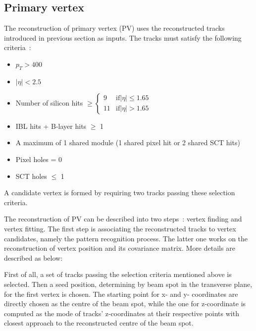 \subsection{Primary vertex}

The reconstruction of primary vertex (PV) uses the reconstructed tracks introduced in previous section as inputs.
The tracks must satisfy the following criteria~\cite{ATL-PHYS-PUB-2015-026}:
\begin{itemize}
	\item $p_{T} > 400$ ~\mev
	\item $|\eta| < 2.5$
	\item Number of silicon hits 
$\geq 
\begin{cases}
9&  \text{if} |\eta| \le 1.65\\
11& \text{if} |\eta| > 1.65
\end{cases}$
	\item IBL hits + B-layer hits $\ge$ 1
	\item A maximum of 1 shared module (1 shared pixel hit or 2 shared SCT hits)
	\item Pixel holes = 0
	\item SCT holes $\le$ 1
\end{itemize}
A candidate vertex is formed by requiring two tracks passing these selection criteria.

The reconstruction of PV can be described into two steps~\cite{Aaboud:2016rmg}: vertex finding and vertex fitting.
The first step is associating the reconstructed tracks to vertex candidates, namely the pattern recognition process.
The latter one works on the reconstruction of vertex position and its covariance matrix.
More details are described as below:

First of all, a set of tracks passing the selection criteria mentioned above is selected.
Then a seed position, determining by beam spot in the transverse plane, for the first vertex is chosen.
The starting point for x- and y- coordinates are directly chosen as the centre of the beam spot,
while the one for z-coordinate is computed as the mode of tracks' z-coordinates at their respective points with closest approach to the reconstructed centre of the beam spot. 

